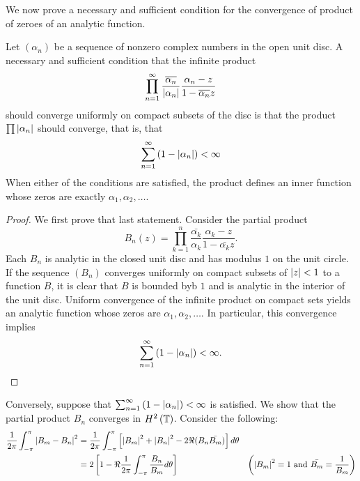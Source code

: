 We now prove a necessary and sufficient condition for the convergence of product of zeroes of an analytic function.

\begin{theorem}
    Let $\left( \alpha_{n} \right)$ be a sequence of nonzero complex numbers in the open unit disc. A necessary and sufficient condition that the infinite product 
    \begin{equation*}
	\prod_{n=1}^{\infty} \frac{\overline{\alpha_{n}}}{\left\lvert \alpha_{n} \right\rvert} \frac{\alpha_{n} - z}{ 1- \overline{\alpha_{n}}z}
    \end{equation*}
    should converge uniformly on compact subsets of the disc is that the product $\prod \left\lvert \alpha_{n} \right\rvert$ should converge, that is, that 
    \begin{equation*}
	\sum_{n=1}^{\infty} \left( 1-\left\lvert \alpha_{n} \right\rvert \right) < \infty
    \end{equation*}
    When either of the conditions are satisfied, the product defines an inner function whose zeros are exactly $\alpha_{1}, \alpha_{2}, \ldots$.
\end{theorem}
\begin{proof}
    We first prove that last statement. Consider the partial product
    \begin{equation*}
	B_{n} \left( z \right) = \prod_{k=1}^{n} \frac{\bar{\alpha_{k}}}{\alpha_{k}} \frac{\alpha_{k}-z}{1-\bar{\alpha_{k}}z}.
    \end{equation*}
    Each $B_{n}$ is analytic in the closed unit disc and has modulus $1$ on the unit circle. If the sequence $\left( B_{n} \right)$ converges uniformly on compact subsets of $\left\lvert z \right\rvert < 1$ to a function $B$, it is clear that $B$ is bounded byb $1$ and is analytic in the interior of the unit disc. Uniform convergence of the infinite product on compact sets yields an analytic function whose zeros are $\alpha_{1}, \alpha_{2}, \ldots$. In particular, this convergence implies
    \begin{equation*}
	\sum_{n=1}^{\infty} \left( 1-\left\lvert \alpha_{n} \right\rvert \right) < \infty.
    \end{equation*}
\end{proof}

Conversely, suppose that $\sum_{n=1}^{\infty} \left( 1-\left\lvert \alpha_{n} \right\rvert \right) < \infty$ is satisfied. We show that the partial product $B_{n}$ converges in $H^{2} \left( \mathbb T \right)$. Consider the following:
\begin{align*}
    \frac{1}{2\pi} \int_{-\pi}^{\pi} \left\lvert B_{m} - B_{n} \right\rvert^{2} &= \frac{1}{2\pi} \int_{-\pi}^{\pi} \left[ \left\lvert B_{m} \right\rvert^{2} + \left\lvert B_{n} \right\rvert^{2} - 2 \Re (B_{n}\bar{B_{m}}) \right] d\theta & \\
    &= 2 \left[ 1 - \Re \frac{1}{2\pi} \int_{-\pi}^{\pi} \frac{B_{n}}{B_{m}} d\theta \right] & \left( \left\lvert B_{m} \right\rvert^{2} = 1 \text{ and } \bar{B_{m}} = \frac{1}{B_{m}} \right) 
\end{align*}


